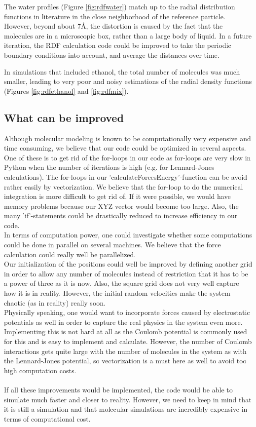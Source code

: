 \documentclass[11pt,a4paper]{article}
\begin{document}
The water profiles (Figure \ref{fig:rdfwater}) match up to the radial distribution functions in literature \cite{radial} in the close neighborhood of the reference particle. However, beyond about 7\AA, the distortion is caused by the fact that the molecules are in a microscopic box, rather than a large body of liquid. In a future iteration, the RDF calculation code could be improved to take the periodic boundary conditions into account, and average the distances over time.

In simulations that included ethanol, the total number of molecules was much smaller, leading to very poor and noisy estimations of the radial density functions (Figures \ref{fig:rdfethanol} and \ref{fig:rdfmix}).

\subsection{What can be improved}
Although molecular modeling is known to be computationally very expensive and time consuming, we believe that our code could be optimized in several aspects. One of these is to get rid of the for-loops in our code as for-loops are very slow in Python when the number of iterations is high (e.g. for Lennard-Jones calculations). The for-loops in our 'calculateForcesEnergy'-function can be avoid rather easily by vectorization. We believe that the for-loop to do the numerical integration is more difficult to get rid of. If it were possible, we would have memory problems because our XYZ vector would become too large. Also, the many 'if'-statements could be drastically reduced to increase efficiency in our code. \\
In terms of computation power, one could investigate whether some computations could be done in parallel on several machines. We believe that the force calculation could really well be parallelized. \\
Our initialization of the positions could well be improved by defining another grid in order to allow any number of molecules instead of restriction that it has to be a power of three as it is now. Also, the square grid does not very well capture how it is in reality. However, the initial random velocities make the system chaotic (as in reality) really soon. \\
Physically speaking, one would want to incorporate forces caused by electrostatic potentials as well in order to capture the real physics in the system even more. Implementing this is not hard at all as the Coulomb potential is commonly used for this and is easy to implement and calculate. However, the number of Coulomb interactions gets quite large with the number of molecules in the system as with the Lennard-Jones potential, so vectorization is a must here as well to avoid too high computation costs. \\
\\ If all these improvements would be implemented, the code would be able to simulate much faster and closer to reality. However, we need to keep in mind that it is still a simulation and that molecular simulations are incredibly expensive in terms of computational cost.
\end{document}
